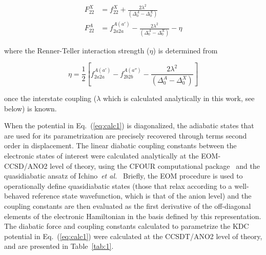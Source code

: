 \documentclass[journal=jpcafh,manuscript=article,layout=onecolumn, 12pt]{achemso}
\begin{document}
\begin{align}
F_{22}^X &= f_{22}^X+\frac{2\lambda^2}{(\Delta_0^A-\Delta_0^X)}\\
F_{22}^A &= f_{2a2a}^{A(a')}-\frac{2\lambda^2}{(\Delta_0^A-\Delta_0^X)}-\eta
\label{eq:calc2}
\end{align}

where the Renner-Teller interaction strength ($\eta$) is determined from 

\begin{equation}
\eta = \frac{1}{2}\left[ f_{2a2a}^{A(a')}-f_{2b2b}^{A(a'')}-\frac{2\lambda^2}{(\Delta_0^A-\Delta_0^X)}\right]
\label{eq:calc3}
\end{equation}

once the interstate coupling ($\lambda$ which is calculated analytically in this work, see below) is known.

When the potential in Eq.~(\ref{eq:calc1}) is diagonalized, the adiabatic states that are used for its parametrization are precisely recovered through terms second order in displacement. The linear diabatic coupling constants between the electronic states of interest were calculated analytically at the EOM-CCSD/ANO2 level of theory, using the CFOUR computational package~\cite{dev20} and the quasidiabatic ansatz of Ichino~\emph{et al.}~\cite{ich09} Briefly, the EOM procedure is used to operationally define quasidiabatic states (those that relax according to a well-behaved reference state wavefunction, which is that of the anion level) and the coupling constants are then evaluated as the first derivative of the off-diagonal elements of the electronic Hamiltonian in the basis defined by this representation. The diabatic force and coupling constants calculated to parametrize the KDC potential in Eq.~(\ref{eq:calc1}) were calculated at the CCSDT/ANO2 level of theory, and are presented in Table~\ref{tab:1}.


\end{document}
